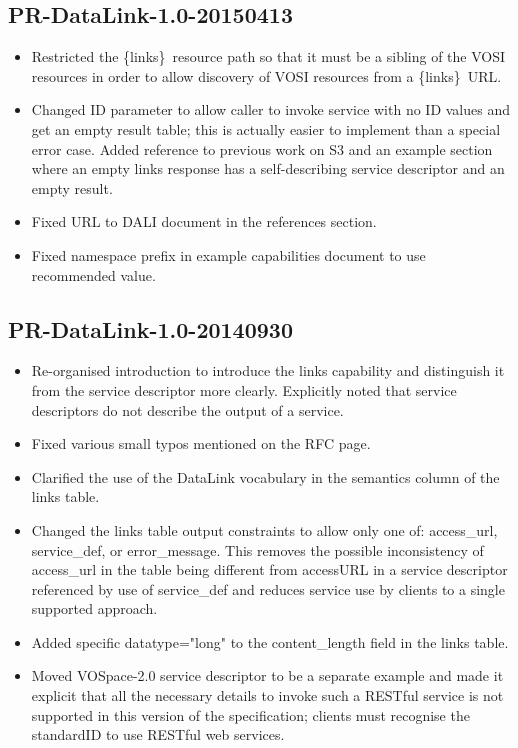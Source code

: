 \documentclass[11pt,a4paper]{ivoa}
\newcommand{\blinks}{\{links\}}
\newcommand{\attval}[2]{#1={\allowbreak}{"}#2{"}}
\begin{document}
\subsection{PR-DataLink-1.0-20150413}

\begin{itemize}
\item
Restricted the \blinks\ resource path so that it must be a sibling of
the VOSI resources in order to allow discovery of VOSI resources from
a \blinks\ URL.
\item
Changed ID parameter to allow caller to invoke service with no ID values
and get an empty result table; this is actually easier to implement
than a special error case. Added reference to previous work on S3 and
an example section where an empty links response has a self-describing
service descriptor and an empty result.
\item
Fixed URL to DALI document in the references section.
\item
Fixed namespace prefix in example capabilities document to use recommended
value.
\end{itemize}


\subsection{PR-DataLink-1.0-20140930}

\begin{itemize}
\item
Re-organised introduction to introduce the links capability and
distinguish it from the service descriptor more clearly. Explicitly
noted that service descriptors do not describe the output of a service.
\item
Fixed various small typos mentioned on the RFC page.
\item
Clarified the use of the DataLink vocabulary in the semantics column of
the links table.
\item
Changed the links table output constraints to allow only one of:
access\_url, service\_def, or error\_message. This removes the possible
inconsistency of access\_url in the table being different from accessURL
in a service descriptor referenced by use of service\_def and reduces
service use by clients to a single supported approach.
\item
Added specific \attval{datatype}{long} to the content\_length field in the
links table.
\item
Moved VOSpace-2.0 service descriptor to be a separate example and made
it explicit that all the necessary details to invoke such a RESTful
service is not supported in this version of the specification; clients
must recognise the standardID to use RESTful web services.
\end{itemize}
\end{document}
